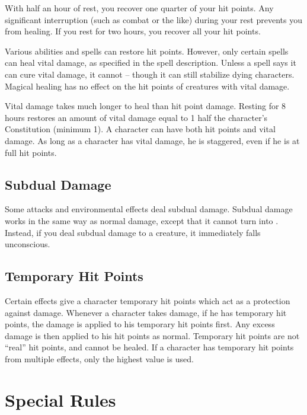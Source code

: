          With half an hour of rest, you recover one quarter of your hit points.
        Any significant interruption (such as combat or the like) during your rest prevents you from healing.
        If you rest for two hours, you recover all your hit points.

         Various abilities and spells can restore hit points.
        However, only certain spells can heal vital damage, as specified in the spell description.
        Unless a spell says it can cure vital damage, it cannot -- though it can still stabilize dying characters.
        Magical healing has no effect on the hit points of creatures with vital damage.

         Vital damage takes much longer to heal than hit point damage.
        Resting for 8 hours restores an amount of vital damage equal to 1 \add half the character's Constitution (minimum 1).
        A character can have both hit points and vital damage.
        As long as a character has vital damage, he is staggered, even if he is at full hit points.

    \subsection{Subdual Damage}\label{Subdual Damage}
        Some attacks and environmental effects deal subdual damage.
        Subdual damage works in the same way as normal damage, except that it cannot turn into .
        Instead, if you deal subdual damage to a  creature, it immediately falls unconscious.

    \subsection{Temporary Hit Points}\label{Temporary Hit Points}
        Certain effects give a character temporary hit points which act as a protection against damage.
        Whenever a character takes damage, if he has temporary hit points, the damage is applied to his temporary hit points first.
        Any excess damage is then applied to his hit points as normal.
        Temporary hit points are not ``real'' hit points, and cannot be healed.
        If a character has temporary hit points from multiple effects, only the highest value is used.

\section{Special Rules}

